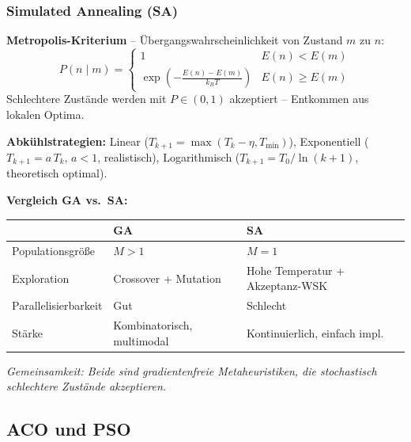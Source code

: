 \subsubsection*{Simulated Annealing (SA)}


\textbf{Metropolis-Kriterium} -- Übergangswahrscheinlichkeit von Zustand $m$ zu $n$:
\[
P(n \mid m) = \begin{cases} 1 & E(n) < E(m) \\ \exp\!\left(-\frac{E(n)-E(m)}{k_B T}\right) & E(n) \geq E(m) \end{cases}
\]
Schlechtere Zustände werden mit $P \in (0,1)$ akzeptiert -- Entkommen aus lokalen Optima.

\textbf{Abkühlstrategien:} Linear ($T_{k+1} = \max(T_k - \eta, T_\text{min})$), Exponentiell ($T_{k+1} = a\,T_k$, $a<1$, realistisch), Logarithmisch ($T_{k+1} = T_0/\ln(k+1)$, theoretisch optimal).

\textbf{Vergleich GA vs.\ SA:}

\begin{table}[H]
\centering
\begin{tabular}{p{3.5cm} p{5cm} p{7cm}}
\hline
 & \textbf{GA} & \textbf{SA} \\
\hline
Populationsgröße & $M > 1$ & $M = 1$ \\
Exploration & Crossover + Mutation & Hohe Temperatur + Akzeptanz-WSK \\
Parallelisierbarkeit & Gut & Schlecht \\
Stärke & Kombinatorisch, multimodal & Kontinuierlich, einfach impl. \\
\end{tabular}
\end{table}

\textit{Gemeinsamkeit: Beide sind gradientenfreie Metaheuristiken, die stochastisch schlechtere Zustände akzeptieren.}

\newpage

\subsection{ACO und PSO}


